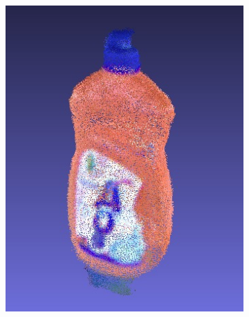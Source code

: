 \documentclass[letterpaper, 10 pt, conference]{ieeeconf}  %
\begin{document}
\begin{figure}[th]
\begin{subfigure}[b]{0.3333\linewidth}
                \includegraphics[width=\linewidth]{../models/aos.jpg}
        \end{subfigure}
        

\end{figure}
\end{document}
